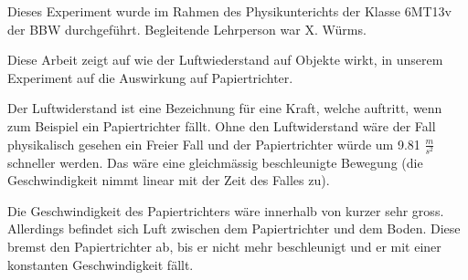 Dieses Experiment wurde im Rahmen des Physikunterichts der Klasse 6MT13v der BBW durchgeführt. Begleitende Lehrperson war X. Würms.

Diese Arbeit zeigt auf wie der Luftwiederstand auf Objekte wirkt, in unserem Experiment auf die Auswirkung auf Papiertrichter.

Der Luftwiderstand ist eine Bezeichnung für eine Kraft, welche auftritt, wenn zum Beispiel ein Papiertrichter fällt. Ohne den Luftwiderstand wäre der Fall physikalisch gesehen ein Freier Fall und der Papiertrichter würde um 9.81 \(\frac{m}{s^2}\) schneller werden. Das wäre eine gleichmässig beschleunigte Bewegung (die Geschwindigkeit nimmt linear mit der Zeit des Falles zu). 

Die Geschwindigkeit des Papiertrichters wäre innerhalb von kurzer sehr gross. Allerdings befindet sich Luft zwischen dem Papiertrichter und dem Boden. Diese bremst den Papiertrichter ab, bis er nicht mehr beschleunigt und er mit einer konstanten Geschwindigkeit fällt.
